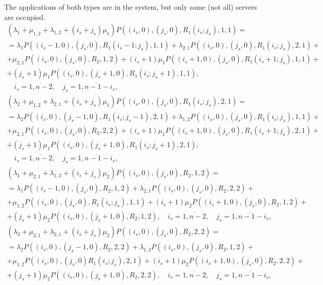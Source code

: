 \documentclass[default]{subfiles}
\begin{document}
{The applications of both types are in the system, but only some (not
all) servers are occupied.
\begin{multline}
  \left(\lambda_1+\mu_{1,2}+\lambda_{1,2}+(i_s+j_s)\mu_1\right)
  P\left((i_s,0),(j_s,0),R_1(i_s;j_s),1,1\right)=\\ =
  \lambda_1
  P\left((i_s-1,0),(j_s,0),R_1(i_s-1;j_s),1,1\right)+\lambda_{2,1}
  P\left((i_s,0),(j_s,0),R_1(i_s;j_s),2,1\right)+\\ +
  \mu_{2,1} P\left((i_s,0),(j_s,0),R_2,1,2\right)+(i_s+1)\mu_1
  P\left((i_s+1,0),(j_s,0),R_1(i_s+1;j_s),1,1\right)+\\ +
  (j_s+1)\mu_1 P\left((i_s,0),(j_s+1,0),R_1(i_s;j_s+1),1,1\right), \\
  \quad i_s=\overline{1,n-2}, \quad j_s=\overline{1,n-1-i_s},
\label{eq:8.1}
\end{multline}
\begin{multline}
  \left(\lambda_2+\mu_{1,2}+\lambda_{2,1}+(i_s+j_s)\mu_1\right)
  P\left((i_s,0),(j_s,0),R_1(i_s;j_s),2,1\right)=\\ =
  \lambda_2
  P\left((i_s,0),(j_s-1,0),R_1(i_s;j_s-1),2,1\right)+\lambda_{1,2}
  P\left((i_s,0),(j_s,0),R_1(i_s;j_s),1,1\right)+\\ +
  \mu_{2,1} P\left((i_s,0),(j_s,0),R_2,2,2\right)+(i_s+1)\mu_1
  P\left((i_s+1,0),(j_s,0),R_1(i_s+1;j_s),2,1\right)+\\ +
  (j_s+1)\mu_1 P\left((i_s,0),(j_s+1,0),R_1(i_s;j_s+1),2,1\right), \\
  \quad i_s=\overline{1,n-2}, \quad j_s=\overline{1,n-1-i_s},
\label{eq:8.2}
\end{multline}
\begin{multline}
  \left(\lambda_1+\mu_{2,1}+\lambda_{1,2}+(i_s+j_s)\mu_2\right)
  P\left((i_s,0),(j_s,0),R_2,1,2\right)=\\ = \lambda_1
  P\left((i_s-1,0),(j_s,0),R_2,1,2\right)+\lambda_{2,1}
  P\left((i_s,0),(j_s,0),R_2,2,2\right)+\\ + \mu_{1,2}
  P\left((i_s,0),(j_s,0),R_1(i_s;j_s),1,1\right)+(i_s+1)\mu_2
  P\left((i_s+1,0),(j_s,0),R_2,1,2\right)+\\ + (j_s+1)\mu_2
  P\left((i_s,0),(j_s+1,0),R_2,1,2\right), \quad i_s=\overline{1,n-2},
  \quad j_s=\overline{1,n-1-i_s},
\label{eq:8.3}
\end{multline}
\begin{multline}
  \left(\lambda_2+\mu_{2,1}+\lambda_{2,1}+(i_s+j_s)\mu_2\right)
  P\left((i_s,0),(j_s,0),R_2,2,2\right)=\\ =
  \lambda_2 P\left((i_s,0),(j_s-1,0),R_2,2,2\right)+\lambda_{1,2}
  P\left((i_s,0),(j_s,0),R_2,1,2\right)+\\ +
  \mu_{1,2} P\left((i_s,0),(j_s,0)R_1(i_s;j_s),2,1\right)+(i_s+1)\mu_2
  P\left((i_s+1,0),(j_s,0),R_2,2,2\right)+\\ +
  (j_s+1)\mu_2 P\left((i_s,0),(j_s+1,0),R_2,2,2\right), \quad
  i_s=\overline{1,n-2}, \quad j_s=\overline{1,n-1-i_s},
\label{eq:8.4}
\end{multline}

}
\end{document}

